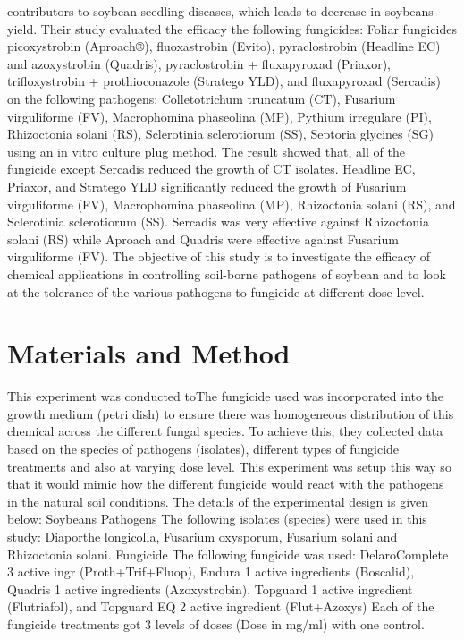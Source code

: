 \documentclass[
  10pt,
  letterpaper,
  twocolumn]{article}
\begin{document}
contributors to soybean seedling diseases, which leads to decrease in
soybeans yield. Their study evaluated the efficacy the following
fungicides: Foliar fungicides picoxystrobin (Aproach®), fluoxastrobin
(Evito), pyraclostrobin (Headline EC) and azoxystrobin (Quadris),
pyraclostrobin + fluxapyroxad (Priaxor), trifloxystrobin +
prothioconazole (Stratego YLD), and fluxapyroxad (Sercadis) on the
following pathogens: Colletotrichum truncatum (CT), Fusarium
virguliforme (FV), Macrophomina phaseolina (MP), Pythium irregulare
(PI), Rhizoctonia solani (RS), Sclerotinia sclerotiorum (SS), Septoria
glycines (SG) using an in vitro culture plug method. The result showed
that, all of the fungicide except Sercadis reduced the growth of CT
isolates. Headline EC, Priaxor, and Stratego YLD significantly reduced
the growth of Fusarium virguliforme (FV), Macrophomina phaseolina (MP),
Rhizoctonia solani (RS), and Sclerotinia sclerotiorum (SS). Sercadis was
very effective against Rhizoctonia solani (RS) while Aproach and Quadris
were effective against Fusarium virguliforme (FV). The objective of this
study is to investigate the efficacy of chemical applications in
controlling soil-borne pathogens of soybean and to look at the tolerance
of the various pathogens to fungicide at different dose level.

\hypertarget{materials-and-method}{%
\section{Materials and Method}\label{materials-and-method}}

This experiment was conducted toThe fungicide used was incorporated into
the growth medium (petri dish) to ensure there was homogeneous
distribution of this chemical across the different fungal species. To
achieve this, they collected data based on the species of pathogens
(isolates), different types of fungicide treatments and also at varying
dose level. This experiment was setup this way so that it would mimic
how the different fungicide would react with the pathogens in the
natural soil conditions. The details of the experimental design is given
below: Soybeans Pathogens The following isolates (species) were used in
this study: Diaporthe longicolla, Fusarium oxysporum, Fusarium solani
and Rhizoctonia solani. Fungicide The following fungicide was used:
DelaroComplete 3 active ingr (Proth+Trif+Fluop), Endura 1 active
ingredients (Boscalid), Quadris 1 active ingredients (Azoxystrobin),
Topguard 1 active ingredient (Flutriafol), and Topguard EQ 2 active
ingredient (Flut+Azoxys) Each of the fungicide treatments got 3 levels
of doses (Dose in mg/ml) with one control.
\end{document}

